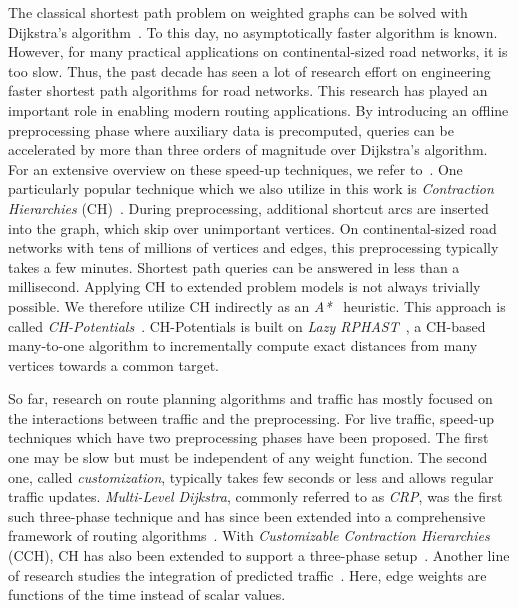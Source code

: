 \documentclass[a4paper,UKenglish,cleveref, autoref, thm-restate]{lipics-v2021}
\begin{document}
The classical shortest path problem on weighted graphs can be solved with Dijkstra's algorithm~\cite{d-ntpcg-59}.
To this day, no asymptotically faster algorithm is known.
However, for many practical applications on continental-sized road networks, it is too slow.
Thus, the past decade has seen a lot of research effort on engineering faster shortest path algorithms for road networks.
This research has played an important role in enabling modern routing applications.
By introducing an offline preprocessing phase where auxiliary data is precomputed, queries can be accelerated by more than three orders of magnitude over Dijkstra's algorithm.
For an extensive overview on these speed-up techniques, we refer to~\cite{bdgmpsww-rptn-16}.
One particularly popular technique which we also utilize in this work is \emph{Contraction Hierarchies} (CH)~\cite{gssv-erlrn-12}.
During preprocessing, additional shortcut arcs are inserted into the graph, which skip over unimportant vertices.
On continental-sized road networks with tens of millions of vertices and edges, this preprocessing typically takes a few minutes.
Shortest path queries can be answered in less than a millisecond.
Applying CH to extended problem models is not always trivially possible.
We therefore utilize CH indirectly as an \emph{A*}~\cite{hnr-afbhd-68} heuristic.
This approach is called \emph{CH-Potentials}~\cite{strasser_et_al:LIPIcs.SEA.2021.6}.
CH-Potentials is built on \emph{Lazy RPHAST}~\cite{strasser_et_al:LIPIcs.SEA.2021.6}, a CH-based many-to-one algorithm to incrementally compute exact distances from many vertices towards a common target.

So far, research on route planning algorithms and traffic has mostly focused on the interactions between traffic and the preprocessing.
For live traffic, speed-up techniques which have two preprocessing phases have been proposed.
The first one may be slow but must be independent of any weight function.
The second one, called \emph{customization}, typically takes few seconds or less and allows regular traffic updates.
\emph{Multi-Level Dijkstra}, commonly referred to as \emph{CRP}, was the first such three-phase technique and has since been extended into a comprehensive framework of routing algorithms~\cite{bdgmpsww-rptn-16}.
With \emph{Customizable Contraction Hierarchies} (CCH), CH has also been extended to support a three-phase setup~\cite{dsw-cch-15}.
Another line of research studies the integration of predicted traffic~\cite{dn-crdtd-12,bgsv-mtdtt-13,bdpw-dtdrp-16,swz-sfert-21}.
Here, edge weights are functions of the time instead of scalar values.
\end{document}
